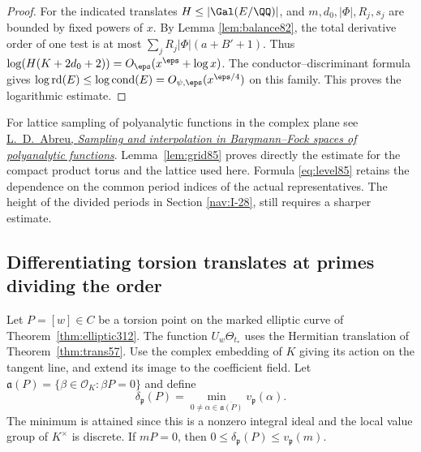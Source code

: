 \documentclass[a4paper,11pt]{article}
\theoremstyle{definition}
\theoremstyle{remark}
\numberwithin{equation}{section}
\newcommand{\OO}{\mathcal O}
\begin{document}
\begin{proof}
For the indicated translates \(H\le|\Gal(E/\QQ)|\), and
\(m,d_0,|\Phi|,R_j,s_j\) are bounded by fixed powers of \(x\).
By Lemma \ref{lem:balance82}, the total derivative order of one test is
at most \(\sum_j R_j|\Phi|(a+B'+1)\). Thus
\(\log(H(K+2d_0+2))=O_\eps(x^\eps+\log x)\).
The conductor--discriminant formula gives
\(\log\operatorname{rd}(E)\le\log\operatorname{cond}(E)
=O_{\psi,\eps}(x^{\eps/4})\) on this family. This proves the
logarithmic estimate.
\end{proof}

For lattice sampling of polyanalytic functions in the complex
plane see \href{https://arxiv.org/abs/0901.4386}{L.~D.~Abreu,
\emph{Sampling and interpolation in Bargmann--Fock spaces of
polyanalytic functions}}. Lemma~\ref{lem:grid85} proves directly
the estimate for the compact product torus and the lattice
used here. Formula \eqref{eq:level85} retains the dependence on
the common period indices of the actual representatives. The
height of the divided periods in Section \ref{nav:I-28}, still
requires a sharper estimate.

\subsection{Differentiating torsion translates at primes dividing the order}\label{nav:VII-62}
Let \(P=[w]\in C\) be a torsion point on the marked elliptic curve
of Theorem~\ref{thm:elliptic312}. The function \(U_w\Theta_{t_*}\)
uses the Hermitian translation of Theorem~\ref{thm:trans57}.
Use the complex embedding of \(K\) giving its action on the tangent
line, and extend its image to the coefficient field. Let
\(\mathfrak a(P)=\{\beta\in\OO_K:\beta P=0\}\) and define
\[
 \delta_{\mathfrak p}(P)=
   \min_{0\ne\alpha\in\overline{\mathfrak a(P)}}v_{\mathfrak p}(\alpha).
\]
The minimum is attained since this is a nonzero integral ideal and
the local value group of \(K^\times\) is discrete. If \(mP=0\), then
\(0\le\delta_{\mathfrak p}(P)\le v_{\mathfrak p}(m)\).
\end{document}
